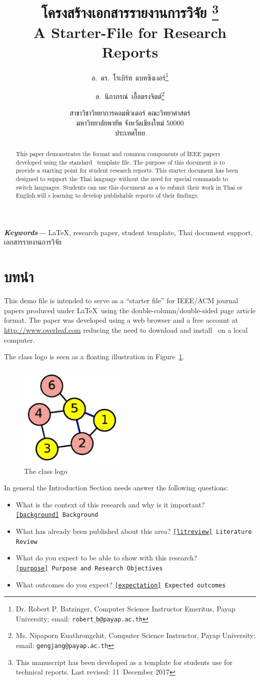 \documentclass[10pt,twocolumn,twoside,a4paper]{article}
\title{โครงสร้างเอกสารรายงานการวิจัย%
\thanks{This manuscript has been developed as a template for students use for technical reports. Last revised: 11~December 2017}\\
A Starter-File for Research Reports}
\author{อ.~ดร.~โรเบิร์ท~แบทซิงเงอร์\thanks{Dr. Robert P. Batzinger, Computer Science Instructor Emeritus, Payap University; 
email: \texttt{robert$\_$b@payap.ac.th}}\and
อ.~นิภาภรณ์~เอื้อตรงจิตต์\thanks{Ms. Nipaporn Euathrongchit, Computer Science Instructor, Payap University; 
email: \texttt{gengjang@payap.ac.th}}}%
\date{สาขาวิชาวิทยาการคอมพิวเตอร์ คณะวิทยาศาสตร์\\
    มหาวิทยาลัยพายัพ จังหวัดเชียงใหม่ 50000\\
    ประเทศไทย}
\providecommand{\keywords}[1]{\noindent\textbf{\textit{Keywords---}} #1}
\begin{document}
\thispagestyle{empty}%
\maketitle

\begin{abstract}
This paper demonstrates the format and common components of IEEE papers developed using the standard \LaTeXe\ template file. The purpose of this document is to provide a starting point for student research reports. This starter document has been designed to support the Thai language without the need for special commands to switch languages. Students can use this document as a to submit their work in Thai or English.will s learning to develop publishable reports of their findings.
\end{abstract}

\bigskip
\keywords{\LaTeX, research paper, student template, Thai document support, เอกสารรายงานการวิจัย}

\section{บทนำ}
This demo file is intended to serve as a ``starter file''
for IEEE/ACM journal papers produced under \LaTeX\ using the double-column/double-sided page article format. The paper was developed using a web browser and a free account at \url{http://www.overleaf.com} reducing the need to download and install \LaTeXe\ on a local computer. 

The class logo is seen as a floating illustration in Figure~\ref{fig_classlogo}.

\begin{figure}[htb]
\centering
\includegraphics[width=2in]{img/classlogo.pdf}
\caption{The class logo}
\label{fig_classlogo}
\end{figure}

In general the Introduction Section needs answer the following questions:

\begin{itemize}
\item What is the context of this research and why is it important? \texttt{\ref{background}~Background}
\item What has already been published about this area?  \texttt{\ref{litreview}~Literature Review}
\item What do you expect to be able to show with this research? \texttt{\ref{purpose}~Purpose and Research Objectives}
\item What outcomes do you expect?
\texttt{\ref{expectation}~Expected outcomes}
\end{itemize}
\end{document}
